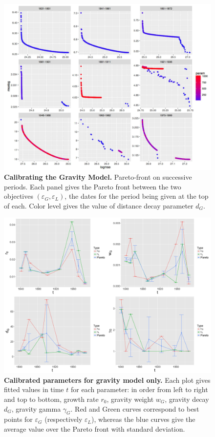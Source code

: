 \documentclass{article}
\begin{document}
\begin{figure}
\centering
\includegraphics[width=\textwidth]{Fig4}
\caption{\textbf{Calibrating the Gravity Model.} Pareto-front on successive periods. Each panel gives the Pareto front between the two objectives $(\varepsilon_G,\varepsilon_L)$, the dates for the period being given at the top of each. Color level gives the value of distance decay parameter $d_G$.}
\label{fig:gravity-pareto}
\end{figure}


\begin{figure}
\centering
\includegraphics[width=\textwidth]{Fig5}
\caption{\textbf{Calibrated parameters for gravity model only.} Each plot gives fitted values in time $t$ for each parameter: in order from left to right and top to bottom, growth rate $r_0$, gravity weight $w_G$, gravity decay $d_G$, gravity gamma $\gamma_G$. Red and Green curves correspond to best points for $\varepsilon_G$ (respectively $\varepsilon_L$), whereas the blue curves give the average value over the Pareto front with standard deviation.}
\label{fig:gravity-params}
\end{figure}
\end{document}
